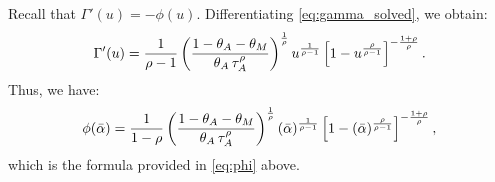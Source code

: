 Recall that \( \Gamma'(u)=-\phi(u) \).
Differentiating \eqref{eq:gamma_solved}, we obtain:
\[
\Gamma'(u)=\frac{1}{\rho-1}\left(\frac{1-\theta_{A}-\theta_{M}}{\theta_{A}\,\tau_{A}^{\rho}}\right)^{\frac{1}{\rho}}u^{\frac{1}{\rho-1}}\left[1-u^{\frac{\rho}{\rho-1}}\right]^{-\frac{1+\rho}{\rho}}.
\]
Thus, we have:
\[
\phi(\bar{\alpha})=\frac{1}{1-\rho}\left(\frac{1-\theta_{A}-\theta_{M}}{\theta_{A}\,\tau_{A}^{\rho}}\right)^{\frac{1}{\rho}}(\bar{\alpha})^{\frac{1}{\rho-1}}\left[1-(\bar{\alpha})^{\frac{\rho}{\rho-1}}\right]^{-\frac{1+\rho}{\rho}},
\]
which is the formula provided in \eqref{eq:phi} above.
